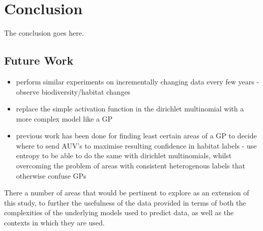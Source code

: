 \chapter{Conclusion} \label{chap:conclusion}

The conclusion goes here.

\section{Future Work}

\begin{itemize}
    \item perform similar experiments on incrementally changing data every few years - observe biodiversity/habitat changes
    \item replace the simple activation function in the dirichlet multinomial with a more complex model like a GP
    \item previous work has been done for finding least certain areas of a GP to decide where to send AUV's to maximise resulting confidence in habitat labels - use entropy to be able to do the same with dirichlet multinomials, whilst overcoming the problem of areas with consistent heterogenous labels that otherwise confuse GPs
\end{itemize}

There a number of areas that would be pertinent to explore as an extension of this study, to further the usefulness of the data provided in terms of both the complexities of the underlying models used to predict data, as well as the contexts in which they are used.

